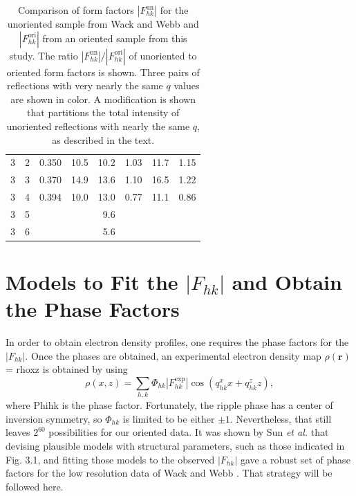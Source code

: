 \begin{table}[htbp]
\begin{tabular}{rrrrrrrr}
    3 &  2 & 0.350                & 10.5  & 10.2  & 1.03 & 11.7  & 1.15 \\
    3 &  3 & 0.370                & 14.9  & 13.6  & 1.10 & 16.5  & 1.22 \\
    3 &  4 & 0.394                & 10.0  & 13.0  & 0.77 & 11.1  & 0.86 \\
    3 &  5 &                      &       & 9.6   &                     \\
    3 &  6 &                      &       & 5.6   &                     \\
    \hline
  \end{tabular}
  \caption[Comparison of form factors $\left|F_{hk}^\text{un}\right|$ for the 
  unoriented sample from Wack and Webb \cite{ref:Wack89} and 
  $\left|F_{hk}^\text{ori}\right|$ from an oriented sample from this study]
  {Comparison of form factors $\left|F_{hk}^\text{un}\right|$ for the 
  unoriented sample from Wack and Webb \cite{ref:Wack89} and 
  $\left|F_{hk}^\text{ori}\right|$ from an oriented sample from this study. 
  The ratio $\left|F_{hk}^\text{un}\right|/\left|F_{hk}^\text{ori}\right|$ of 
  unoriented to oriented form factors is shown.  Three pairs of reflections 
  with very nearly the same $q$ values are shown in color.  A modification is 
  shown that partitions the total intensity of unoriented reflections with 
  nearly the same $q$, as described in the text.}
  \label{tab:cmu_vs_wack}
\end{table}

\newpage
\section{Models to Fit the $|F_{hk}|$ and Obtain the Phase Factors}\label{sec:LAXS_models}
In order to obtain electron density profiles, one requires the phase factors 
for the $|F_{hk}|$.  
Once the phases are obtained, an experimental electron density map 
$\rho(\mathbf{r})$ = \gls{rhoxz} is obtained
by using
\begin{equation}
  \rho(x,z) = \sum_{h,k} \Phi_{hk} \left|F_{hk}^\text{exp}\right| \cos(q_{hk}^xx+q_{hk}^zz),
  \label{eq:Fourier_reconstruction}
\end{equation}
where \gls{Phihk} is the phase factor.  
Fortunately, the ripple phase has a center of inversion symmetry, so 
$\Phi_{hk}$ is limited to be either $\pm 1$. Nevertheless, that still 
leaves $2^{60}$ possibilities for our oriented data.  
It was shown by Sun \textit{et al.} \cite{ref:Sun96} that devising plausible 
models with structural parameters, such as those indicated in Fig. 3.1, and 
fitting those models to the observed $|F_{hk}|$ gave a robust set of phase 
factors for the low resolution data of Wack and Webb \cite{ref:Wack89}.  
That strategy will be followed here.

